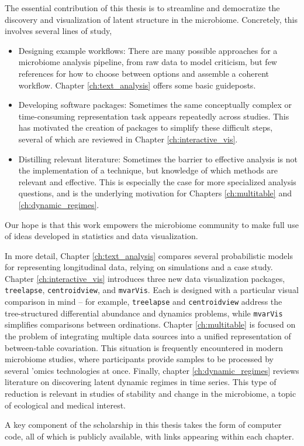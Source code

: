 The essential contribution of this thesis is to streamline and democratize the
discovery and visualization of latent structure in the microbiome. Concretely,
this involves several lines of study,
\begin{itemize}
  \item Designing example workflows: There are many possible approaches for a
    microbiome analysis pipeline, from raw data to model criticism, but few
    references for how to choose between options and assemble a coherent
    workflow. Chapter \ref{ch:text_analysis} offers some basic guideposts.
  \item Developing software packages: Sometimes the same conceptually complex or
    time-consuming representation task appears repeatedly across studies. This
    has motivated the creation of packages to simplify these difficult steps,
    several of which are reviewed in Chapter \ref{ch:interactive_vis}.
  \item Distilling relevant literature: Sometimes the barrier to effective
    analysis is not the implementation of a technique, but knowledge of which
    methods are relevant and effective. This is especially the case for more
    specialized analysis questions, and is the underlying motivation for
    Chapters \ref{ch:multitable} and \ref{ch:dynamic_regimes}.
\end{itemize}
Our hope is that this work empowers the microbiome community to make full use of
ideas developed in statistics and data visualization.

In more detail, Chapter \ref{ch:text_analysis} compares several probabilistic
models for representing longitudinal data, relying on simulations and a case
study. Chapter \ref{ch:interactive_vis} introduces three new data visualization
packages, \texttt{treelapse}, \texttt{centroidview}, and \texttt{mvarVis}. Each
is designed with a particular visual comparison in mind -- for example,
\texttt{treelapse} and \texttt{centroidview} address the tree-structured
differential abundance and dynamics problems, while \texttt{mvarVis} simplifies
comparisons between ordinations. Chapter \ref{ch:multitable} is focused on the
problem of integrating multiple data sources into a unified representation of
between-table covariation. This situation is frequently encountered in modern
microbiome studies, where participants provide samples to be processed by
several 'omics technologies at once. Finally, chapter \ref{ch:dynamic_regimes}
reviews literature on discovering latent dynamic regimes in time series. This
type of reduction is relevant in studies of stability and change in the
microbiome, a topic of ecological and medical interest.

A key component of the scholarship in this thesis takes the form of computer
code, all of which is publicly available, with links appearing within each
chapter.
